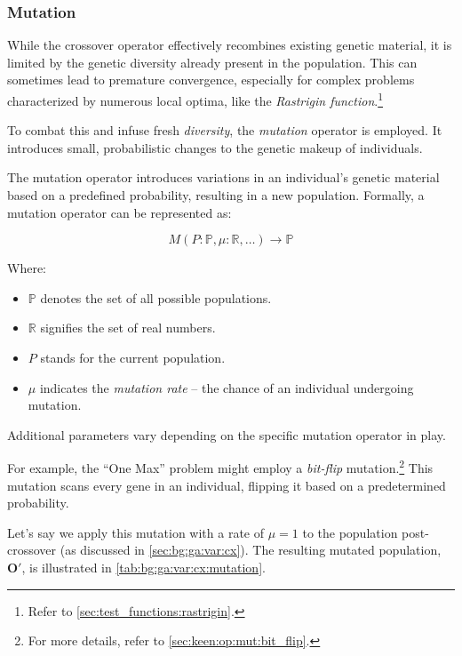 \subsubsection{Mutation}
\label{sec:bg:ga:var:mut}
  While the crossover operator effectively recombines existing genetic material, it is limited by the genetic diversity 
  already present in the 
  population.
  This can sometimes lead to premature convergence, especially for complex 
  problems characterized by numerous local optima, like the \emph{Rastrigin function}.\footnote{Refer to \vref{sec:test_functions:rastrigin}.}

  To combat this and infuse fresh \textit{diversity}, the \textit{mutation} 
  operator is employed.
  It introduces small, probabilistic changes to the genetic makeup of 
  individuals.

  \begin{definition}
  \label{def:mutation_operator}
    The mutation operator introduces variations in an individual's genetic 
    material based on a predefined probability, resulting in a new population. 
    Formally, a mutation operator can be represented as:

    \[ 
      M(P: \mathbb{P}, \mu: \mathbb{R}, \dots) \to \mathbb{P}
    \]

    Where:

    \begin{itemize}
      \item \(\mathbb{P}\) denotes the set of all possible populations.
      \item \(\mathbb{R}\) signifies the set of real numbers.
      \item \(P\) stands for the current population.
      \item \(\mu\) indicates the \textit{mutation rate} -- the chance of an 
        individual undergoing mutation.
    \end{itemize}

    Additional parameters vary depending on the specific mutation operator in   
    play.
  \end{definition}

  For example, the \enquote{One Max} problem might employ a \emph{bit-flip} 
  mutation.\footnote{
    For more details, refer to \vref{sec:keen:op:mut:bit_flip}.
  }
  This mutation scans every gene in an individual, flipping it based on a 
  predetermined probability.

  Let's say we apply this mutation with a rate of \(\mu = 1\) to the population 
  post-crossover (as discussed in \vref{sec:bg:ga:var:cx}).
  The resulting mutated population, \(\mathbf{O}'\), is illustrated in 
  \vref{tab:bg:ga:var:cx:mutation}.

